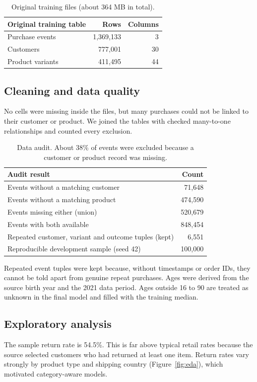 \documentclass[11pt,a4paper]{article}
\begin{document}
\begin{table}[H]\centering
\begin{tabularx}{.8\linewidth}{Xrr}
\toprule Original training table & Rows & Columns\\ \midrule
Purchase events & 1,369,133 & 3\\
Customers & 777,001 & 30\\
Product variants & 411,495 & 44\\ \bottomrule
\end{tabularx}
\caption{Original training files (about 364 MB in total).}
\end{table}

\subsection{Cleaning and data quality}
No cells were missing inside the files, but many purchases could not be linked to their customer or product. We joined the tables with checked many-to-one relationships and counted every exclusion.

\begin{table}[H]\centering
\begin{tabularx}{.8\linewidth}{Xr}
\toprule Audit result & Count\\ \midrule
Events without a matching customer & 71,648\\
Events without a matching product & 474,590\\
Events missing either (union) & 520,679\\
Events with both available & 848,454\\
Repeated customer, variant and outcome tuples (kept) & 6,551\\
Reproducible development sample (seed 42) & 100,000\\ \bottomrule
\end{tabularx}
\caption{Data audit. About 38\% of events were excluded because a customer or product record was missing.}
\end{table}

Repeated event tuples were kept because, without timestamps or order IDs, they cannot be told apart from genuine repeat purchases. Ages were derived from the source birth year and the 2021 data period. Ages outside 16 to 90 are treated as unknown in the final model and filled with the training median.

\subsection{Exploratory analysis}
The sample return rate is 54.5\%. This is far above typical retail rates because the source selected customers who had returned at least one item. Return rates vary strongly by product type and shipping country (Figure~\ref{fig:eda}), which motivated category-aware models.
\end{document}
